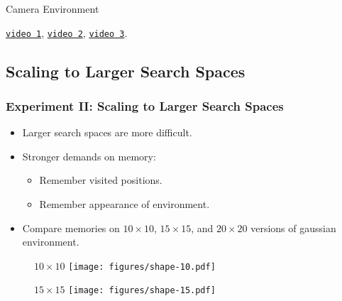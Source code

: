 \begin{frame}
    \begin{table}
        \centering
        Camera Environment\par\vspace{0.5em}
        
    \end{table}

    \begin{center}
        \href{run:./videos/camera/lstm/1000.mp4}{\texttt{video 1}},
        \href{run:./videos/camera/lstm/500.mp4}{\texttt{video 2}},
        \href{run:./videos/camera/lstm/1.mp4}{\texttt{video 3}}.
    \end{center}
\end{frame}

\subsection{Scaling to Larger Search Spaces}

\begin{frame}
    \frametitle{Experiment II: Scaling to Larger Search Spaces}

    \begin{itemize}
        \item Larger search spaces are more difficult.
        \item Stronger demands on memory:
        \begin{itemize}
            \item Remember visited positions.
            \item Remember appearance of environment.
        \end{itemize}
        \item Compare memories on \(10 \times 10\), \(15 \times 15\), and \(20 \times 20\) versions of gaussian environment.
    \end{itemize}
\end{frame}

\begin{frame}
    \begin{figure}
        \centering
        \(10 \times 10\)
        \texttt{[image: figures/shape-10.pdf]}
    \end{figure}
\end{frame}

\begin{frame}
    \begin{figure}
        \centering
        \(15 \times 15\)
        \texttt{[image: figures/shape-15.pdf]}
    \end{figure}
\end{frame}

